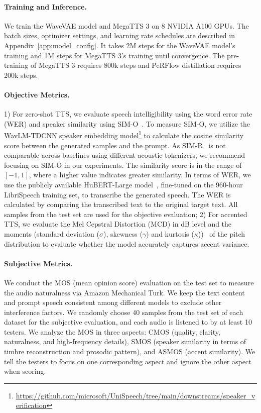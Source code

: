 \paragraph{Training and Inference.} 
We train the WaveVAE model and MegaTTS 3 on 8 NVIDIA A100 GPUs. The batch sizes, optimizer settings, and learning rate schedules are described in Appendix~\ref{app:model_config}. It takes 2M steps for the WaveVAE model's training and 1M steps for MegaTTS 3's training until convergence. The pre-training of MegaTTS 3 requires 800k steps and PeRFlow distillation requires 200k steps.
\paragraph{Objective Metrics.} 1) For zero-shot TTS, we evaluate speech intelligibility using the word error rate (WER) and speaker similarity using SIM-O~\citep{ju2024naturalspeech}. To measure SIM-O, we utilize the WavLM-TDCNN speaker embedding model\footnote{\url{https://github.com/microsoft/UniSpeech/tree/main/downstreams/speaker_verification}} to calculate the cosine similarity score between the generated samples and the prompt. As SIM-R~\citep{le2023Voicebox} is not comparable across baselines using different acoustic tokenizers, we recommend focusing on SIM-O in our experiments. The similarity score is in the range of $\left[-1,1\right]$, where a higher value indicates greater similarity. In terms of WER, we use the publicly available HuBERT-Large model~\citep{hsu2021hubert}, fine-tuned on the 960-hour LibriSpeech training set, to transcribe the generated speech. The WER is calculated by comparing the transcribed text to the original target text. All samples from the test set are used for the objective evaluation; 2) For accented TTS, we evaluate the Mel Cepstral Distortion (MCD) in dB level and the moments (standard deviation ($\sigma$), skewness ($\gamma$) and kurtosis ($\kappa$))~\citep{andreeva2014differences,niebuhr2019measuring} of the pitch distribution to evaluate whether the model accurately captures accent variance. 

\paragraph{Subjective Metrics.} We conduct the MOS (mean opinion score) evaluation on the test set to measure the audio naturalness via Amazon Mechanical Turk. We keep the text content and prompt speech consistent among different models to exclude other interference factors. We randomly choose 40 samples from the test set of each dataset for the subjective evaluation, and each audio is listened to by at least 10 testers. We analyze the MOS in three aspects: CMOS (quality, clarity, naturalness, and high-frequency details), SMOS (speaker similarity in terms of timbre reconstruction and prosodic pattern), and ASMOS (accent similarity). We tell the testers to focus on one corresponding aspect and ignore the other aspect when scoring.



